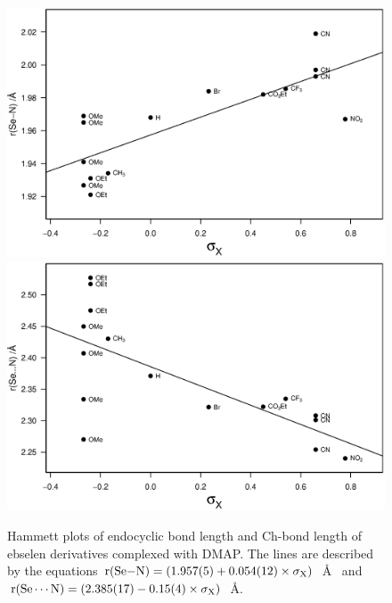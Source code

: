 \begin{refsection}
\begin{figure}
    \centering
    \includegraphics[width=0.9\linewidth]{Figures/hammett-endo-dmap.eps}
    \includegraphics[width=0.9\linewidth]{Figures/hammett-dmap.eps}
    \caption[Hammett plots of endocyclic  bond length and  Ch-bond length of ebselen derivatives complexed with DMAP.]{Hammett plots of endocyclic  bond length and  Ch-bond length of ebselen derivatives complexed with DMAP. The lines are described by the equations $\mathrm{r}(\ce{Se-N}) = (1.957(5) + 0.054(12) \times \sigma_{\mathrm{X}})$~\AA~ and $\mathrm{r}(\ce{Se\cdots N}) = (2.385(17) - 0.15(4) \times \sigma_{\mathrm{X}})$~\AA.}
    \label{fig:hammett-dmap}
\end{figure}


\end{refsection}
